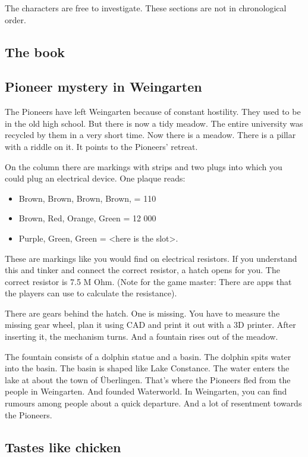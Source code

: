 The characters are free to investigate. These sections are not in chronological order.

\subsection{The book}

\subsection{Pioneer mystery in Weingarten}

The Pioneers have left Weingarten because of constant hostility. They used to be in the old high school. But there is now a tidy meadow. The entire university was recycled by them in a very short time. Now there is a meadow.
There is a pillar with a riddle on it. It points to the Pioneers' retreat.

On the column there are markings with strips and two plugs into which you could plug an electrical device. One plaque reads:

\begin{itemize}
    \item Brown, Brown, Brown, Brown, = 110
    \item Brown, Red, Orange, Green = 12 000
    \item Purple, Green, Green = <here is the slot>.
\end{itemize}

These are markings like you would find on electrical resistors. If you understand this and tinker and connect the correct resistor, a hatch opens for you. The correct resistor is 7.5 M Ohm.
(Note for the game master: There are apps that the players can use to calculate the resistance).

There are gears behind the hatch. One is missing.
You have to measure the missing gear wheel, plan it using CAD and print it out with a 3D printer. After inserting it, the mechanism turns. And a fountain rises out of the meadow.

The fountain consists of a dolphin statue and a basin.
The dolphin spits water into the basin. The basin is shaped like Lake Constance. The water enters the lake at about the town of Überlingen.
That's where the Pioneers fled from the people in Weingarten. And founded Waterworld.
In Weingarten, you can find rumours among people about a quick departure. And a lot of resentment towards the Pioneers.

\subsection{Tastes like chicken}

